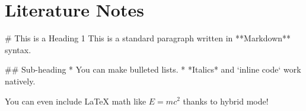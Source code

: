 
\section{Literature Notes}

\begin{markdown}
# This is a Heading 1
This is a standard paragraph written in **Markdown** syntax.

## Sub-heading
* You can make bulleted lists.
* *Italics* and `inline code` work natively.

You can even include LaTeX math like $E = mc^2$ thanks to hybrid mode!
\end{markdown}
